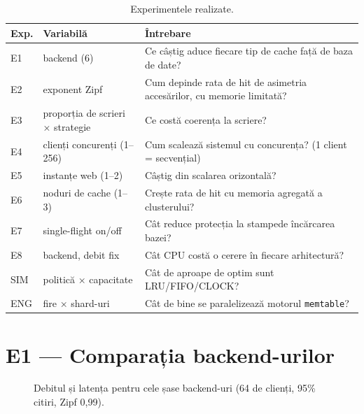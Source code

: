 \begin{table}[H]
\centering\small
\begin{tabularx}{\linewidth}{llX}
\toprule
Exp. & Variabilă & Întrebare \\
\midrule
E1 & backend (6) & Ce câștig aduce fiecare tip de cache față de baza de date? \\
E2 & exponent Zipf & Cum depinde rata de hit de asimetria accesărilor, cu memorie limitată? \\
E3 & proporția de scrieri × strategie & Ce costă coerența la scriere? \\
E4 & clienți concurenți (1–256) & Cum scalează sistemul cu concurența? (1 client = secvențial) \\
E5 & instanțe web (1–2) & Câștig din scalarea orizontală? \\
E6 & noduri de cache (1–3) & Crește rata de hit cu memoria agregată a clusterului? \\
E7 & single-flight on/off & Cât reduce protecția la stampede încărcarea bazei? \\
E8 & backend, debit fix & Cât CPU costă o cerere în fiecare arhitectură? \\
SIM & politică × capacitate & Cât de aproape de optim sunt LRU/FIFO/CLOCK? \\
ENG & fire × shard-uri & Cât de bine se paralelizează motorul \texttt{memtable}? \\
\bottomrule
\end{tabularx}
\caption{Experimentele realizate.}
\end{table}

\section{E1 — Comparația backend-urilor}

\begin{figure}[H]
  \centering
  \caption{Debitul și latența pentru cele șase backend-uri (64 de clienți, 95\% citiri, Zipf 0,99).}
  \label{fig:e1}
\end{figure}

